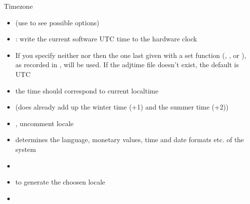 \begin{frame}{Timezone\vspace{0.5cm}}
  \begin{itemize}
    \item {} (use  to see possible options)
    \item {}: write the current software UTC time to the hardware clock
      \item If you specify neither  nor  then the one last given with a set function  (, , or ), as recorded in , will be used. If the adjtime file doesn't exist, the default is UTC
      \item the  time should correspond to current localtime
      \item {} (does already add up the winter time (+1) and the summer time (+2))
    \item {}, uncomment locale 
      \item determines the language, monetary values, time and date formats etc. of the system
      \item {}
    \item {} to generate the choosen locale
    \item {}
  \end{itemize}
\end{frame}

